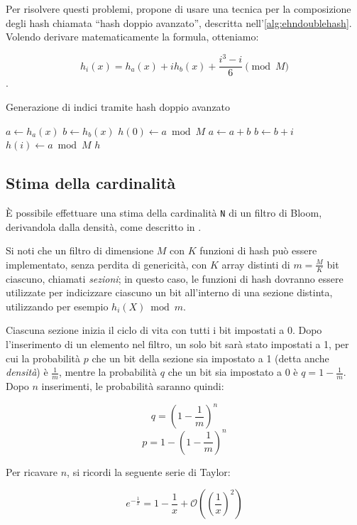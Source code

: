 Per risolvere questi problemi, \cite{bloom-doublehash} propone di usare una tecnica per la
composizione degli hash chiamata ``hash doppio avanzato'', descritta
nell'\autoref{alg:ehndoublehash}. Volendo derivare matematicamente la formula, otteniamo:

$$ h_i(x) = h_a(x) + ih_b(x) + \frac{i^3-i}{6} \pmod M $$.

\begin{algorithm}
\caption{Generazione di indici tramite hash doppio avanzato}
\label{alg:ehndoublehash}
\begin{algorithmic}[1]
	\State $a \gets h_a(x)$
	\State $b \gets h_b(x)$
	\State $h(0) \gets a \bmod M$
		\State $a \gets a+b$
		\State $b \gets b+i$
		\State $h(i) \gets a \bmod M$
	\EndFor
	\State \Return $h$
\EndProcedure
\end{algorithmic}
\end{algorithm}

\subsection{Stima della cardinalità}
\label{sec:bloomcard}

È possibile effettuare una stima della cardinalità \verb|N| di un filtro di Bloom, derivandola
dalla densità, come descritto in \cite{bloom-scalable}.

Si noti che un filtro di dimensione $M$ con $K$ funzioni di hash può essere implementato, senza
perdita di genericità, con $K$ array distinti di $m=\frac{M}{K}$ bit ciascuno, chiamati
\emph{sezioni}; in questo caso, le funzioni di hash dovranno essere utilizzate per indicizzare
ciascuno un bit all'interno di una sezione distinta, utilizzando per esempio $h_i(X) \bmod m$.

Ciascuna sezione inizia il ciclo di vita con tutti i bit impostati a 0. Dopo l'inserimento di un
elemento nel filtro, un solo bit sarà stato impostati a 1, per cui la probabilità $p$ che un bit
della sezione sia impostato a 1 (detta anche \emph{densità}) è $\frac{1}{m}$, mentre la probabilità
$q$ che un bit sia impostato a 0 è $ q=1-\frac{1}{m}$. Dopo $n$ inserimenti, le probabilità saranno
quindi: 

$$ q = (1-\frac{1}{m})^n $$
$$ p = 1-(1-\frac{1}{m})^n $$

Per ricavare $n$, si ricordi la seguente serie di Taylor:

$$ e^{-\frac{1}{x}} = 1 - \frac{1}{x} + \mathcal{O}((\frac{1}{x})^2) $$

